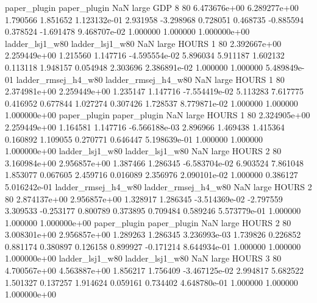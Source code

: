       paper_plugin        paper_plugin                   NaN      large      GDP                 8 80 6.473676e+00   6.289277e+00      1.790566       1.851652  1.123132e-01      2.931958     -3.298968     0.728051       0.468735 -0.885594   0.378524    -1.691478   9.468707e-02            1.000000        1.000000        1.000000e+00
    ladder_lsj1_w80     ladder_lsj1_w80                   NaN      large    HOURS                 1 80 2.392667e+00   2.259449e+00      1.215560       1.147716 -4.595554e-02      5.896034      5.911187     1.602132       0.113118  1.948157   0.054948     2.303696   2.386891e-02            1.000000        1.000000        5.489849e-01
ladder_rmsej_h4_w80 ladder_rmsej_h4_w80                   NaN      large    HOURS                 1 80 2.374981e+00   2.259449e+00      1.235147       1.147716 -7.554419e-02      5.113283      7.617775     0.416952       0.677844  1.027274   0.307426     1.728537   8.779871e-02            1.000000        1.000000        1.000000e+00
       paper_plugin        paper_plugin                   NaN      large    HOURS                 1 80 2.324905e+00   2.259449e+00      1.164581       1.147716 -6.566188e-03      2.896966      1.469438     1.415364       0.160892  1.109055   0.270771     0.646447   5.198639e-01            1.000000        1.000000        1.000000e+00
    ladder_lsj1_w80     ladder_lsj1_w80                   NaN      large    HOURS                 2 80 3.160984e+00   2.956857e+00      1.387466       1.286345 -6.583704e-02      6.903524      7.861048     1.853077       0.067605  2.459716   0.016089     2.356976   2.090101e-02            1.000000        0.386127        5.016242e-01
ladder_rmsej_h4_w80 ladder_rmsej_h4_w80                   NaN      large    HOURS                 2 80 2.874137e+00   2.956857e+00      1.328917       1.286345 -3.514369e-02     -2.797559      3.309533    -0.253177       0.800789  0.373895   0.709484     0.589246   5.573779e-01            1.000000        1.000000        1.000000e+00
       paper_plugin        paper_plugin                   NaN      large    HOURS                 2 80 3.008301e+00   2.956857e+00      1.289263       1.286345  3.236993e-03      1.739826      0.226852     0.881174       0.380897  0.126158   0.899927    -0.171214   8.644934e-01            1.000000        1.000000        1.000000e+00
    ladder_lsj1_w80     ladder_lsj1_w80                   NaN      large    HOURS                 3 80 4.700567e+00   4.563887e+00      1.856217       1.756409 -3.467125e-02      2.994817      5.682522     1.501327       0.137257  1.914624   0.059161     0.734402   4.648780e-01            1.000000        1.000000        1.000000e+00

